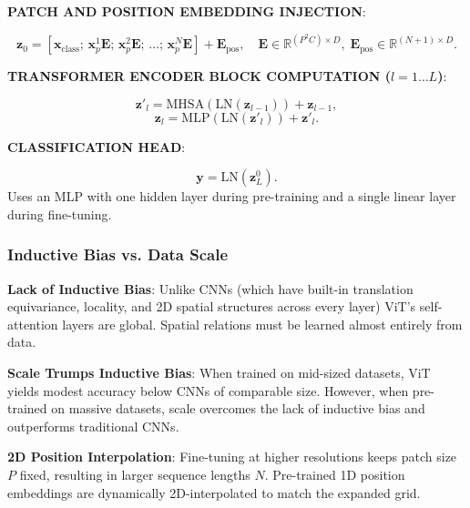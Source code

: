 \begin{dashlist}
    \item \textbf{PATCH AND POSITION EMBEDDING INJECTION}: 
    
    \[
    \mathbf{z}_0 = [\mathbf{x}_{\text{class}}; \, \mathbf{x}_p^1 \mathbf{E}; \, \mathbf{x}_p^2 \mathbf{E}; \, \dots; \, \mathbf{x}_p^N \mathbf{E}] + \mathbf{E}_{\text{pos}} , 
    \quad \mathbf{E} \in \mathbb{R}^{(P^2 C) \times D}, \; \mathbf{E}_{\text{pos}} \in \mathbb{R}^{(N+1) \times D} .
    \]

    \item \textbf{TRANSFORMER ENCODER BLOCK COMPUTATION ($l = 1 \dots L$)}: 
    
    \[
    \mathbf{z}'_l = \text{MHSA}(\text{LN}(\mathbf{z}_{l-1})) + \mathbf{z}_{l-1} ,
    \]
    \[
    \mathbf{z}_l = \text{MLP}(\text{LN}(\mathbf{z}'_l)) + \mathbf{z}'_l .
    \]

    \item \textbf{CLASSIFICATION HEAD}: 
    
    \[
    \mathbf{y} = \text{LN}(\mathbf{z}_L^0) .
    \]
    Uses an MLP with one hidden layer during pre-training and a single linear layer during fine-tuning.
\end{dashlist}
\subsubsection{Inductive Bias vs. Data Scale}
\begin{dashlist}
    \item \textbf{Lack of Inductive Bias}: Unlike CNNs (which have built-in translation equivariance, locality, and 2D spatial structures across every layer) ViT's self-attention layers are global. Spatial relations must be learned almost entirely from data.
    \item \textbf{Scale Trumps Inductive Bias}: When trained on mid-sized datasets, ViT yields modest accuracy below CNNs of comparable size. However, when pre-trained on massive datasets, scale overcomes the lack of inductive bias and outperforms traditional CNNs.
    \item \textbf{2D Position Interpolation}: Fine-tuning at higher resolutions keeps patch size $P$ fixed, resulting in larger sequence lengths $N$. Pre-trained 1D position embeddings are dynamically 2D-interpolated to match the expanded grid.
\end{dashlist}

